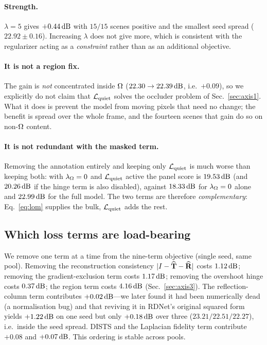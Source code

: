 \paragraph{Strength.} $\lambda=5$ gives $+0.44\,\mathrm{dB}$ with $15/15$ scenes positive and the smallest
seed spread ($22.92\pm0.16$). Increasing $\lambda$ does not give more, which is consistent with the
regularizer acting as a \emph{constraint} rather than as an additional objective.

\paragraph{It is not a region fix.} The gain is \emph{not} concentrated inside $\Omega$
($22.30\rightarrow22.39\,\mathrm{dB}$, i.e.\ $+0.09$), so we explicitly do not claim that $\mathcal{L}_{\mathrm{quiet}}$ solves
the occluder problem of Sec.~\ref{sec:axis1}. What it does is prevent the model from moving pixels
that need no change; the benefit is spread over the whole frame, and the fourteen scenes that gain
do so on non-$\Omega$ content.

\paragraph{It is not redundant with the masked term.} Removing the annotation entirely and keeping
only $\mathcal{L}_{\mathrm{quiet}}$ is much worse than keeping both: with $\lambda_\Omega=0$ and $\mathcal{L}_{\mathrm{quiet}}$ active the panel
score is $19.53\,\mathrm{dB}$ (and $20.26\,\mathrm{dB}$ if the hinge term is also disabled), against $18.33\,\mathrm{dB}$ for
$\lambda_\Omega=0$ alone and $22.99\,\mathrm{dB}$ for the full model. The two terms are therefore
\emph{complementary}: Eq.~\eqref{eq:lom} supplies the bulk, $\mathcal{L}_{\mathrm{quiet}}$ adds the rest.

\subsection{Which loss terms are load-bearing}

We remove one term at a time from the nine-term objective (single seed, same pool). Removing the
reconstruction consistency $|I-\widehat{\mathbf{T}}-\widehat{\mathbf{R}}|$ costs $1.12\,\mathrm{dB}$; removing the gradient-exclusion term
costs $1.17\,\mathrm{dB}$; removing the overshoot hinge costs $0.37\,\mathrm{dB}$; the region term costs
$4.16\,\mathrm{dB}$ (Sec.~\ref{sec:axis3}). The reflection-column term contributes $+0.02\,\mathrm{dB}$---we later
found it had been numerically dead (a normalisation bug) and that reviving it in RDNet's original
squared form yields $+1.22\,\mathrm{dB}$ on one seed but only $+0.18\,\mathrm{dB}$ over three ($23.21/22.51/22.27$),
i.e.\ inside the seed spread. DISTS and the Laplacian fidelity term contribute $+0.08$ and
$+0.07\,\mathrm{dB}$. This ordering is stable across pools.

